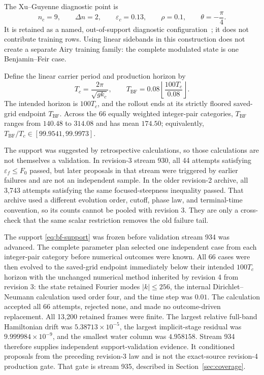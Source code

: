 \documentclass[11pt]{article}
\newcommand{\eps}{\varepsilon}
\begin{document}
The Xu--Guyenne diagnostic point is
\begin{equation}
  n_c=9,\qquad \Delta n=2,\qquad \eps_c=0.13,\qquad
  \rho=0.1,\qquad \theta=-\frac{\pi}{4}.
  \label{eq:xu-guyenne-bf-point}
\end{equation}
It is retained as a named, out-of-support diagnostic
configuration~\cite{xu2009}; it does not contribute training rows.  Using
linear sidebands in this construction does not create a separate Airy
training family: the complete modulated state is one Benjamin--Feir case.

Define the linear carrier period and production horizon by
\begin{equation}
  T_c=\frac{2\pi}{\sqrt{gk_c}},\qquad
  T_{\mathrm{BF}}
  =0.08\left\lfloor\frac{100T_c}{0.08}\right\rfloor.
  \label{eq:bf-carrier-period-horizon}
\end{equation}
The intended horizon is $100T_c$, and the rollout ends at its strictly
floored saved-grid endpoint $T_{\mathrm{BF}}$.  Across the 66 equally
weighted integer-pair categories, $T_{\mathrm{BF}}$ ranges from $140.48$ to
$314.08$ and has mean $174.50$; equivalently,
$T_{\mathrm{BF}}/T_c\in[99.9541,99.9973]$.

The support was suggested by retrospective calculations, so those
calculations are not themselves a validation.  In revision-3 stream 930, all
44 attempts satisfying $\eps_f\leq F_0$ passed, but later proposals in that
stream were triggered by earlier failures and are not an independent sample.
In the older revision-2 archive, all 3,743 attempts satisfying the same
focused-steepness inequality passed.  That archive used a different evolution
order, cutoff, phase law, and terminal-time convention, so its counts cannot
be pooled with revision 3.  They are only a cross-check that the same scalar
restriction removes the old failure tail.

The support \eqref{eq:bf-support} was frozen before validation stream 934 was
advanced.  The complete parameter plan selected one independent case from
each integer-pair category before numerical outcomes were known.  All 66
cases were then evolved to the saved-grid endpoint immediately below their
intended $100T_c$ horizon with the unchanged
numerical method inherited by revision 4 from revision 3: the state retained
Fourier modes $|k|\leq256$, the
internal Dirichlet--Neumann calculation used order four, and the time step
was $0.01$.  The calculation accepted all 66 attempts,
rejected none, and made no outcome-driven replacement.  All 13,200 retained
frames were finite.  The largest relative full-band Hamiltonian drift was
$5.38713\times10^{-5}$, the largest implicit-stage residual was
$9.999984\times10^{-9}$, and the smallest water column was $4.958158$.
Stream 934 therefore supplies independent support-validation evidence.  It
conditioned proposals from the preceding revision-3 law and is not the
exact-source revision-4 production gate.  That gate is stream 935, described
in Section~\ref{sec:coverage}.
\end{document}
